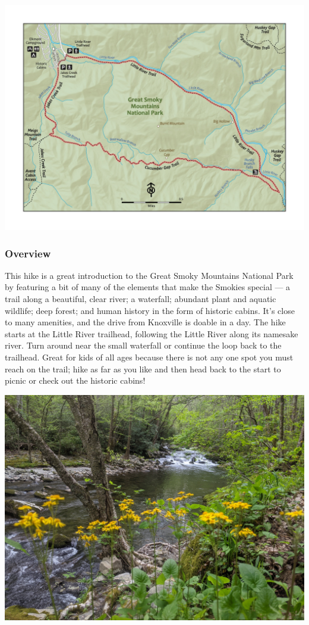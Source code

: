 \documentclass[
  letterpaper,
  DIV=11,
  numbers=noendperiod]{scrartcl}
\begin{document}
\includegraphics{maps/trail-21-map.jpeg}

\hypertarget{overview-20}{%
\subsubsection{Overview}\label{overview-20}}

This hike is a great introduction to the Great Smoky Mountains National
Park by featuring a bit of many of the elements that make the Smokies
special --- a trail along a beautiful, clear river; a waterfall;
abundant plant and aquatic wildlife; deep forest; and human history in
the form of historic cabins. It's close to many amenities, and the drive
from Knoxville is doable in a day. The hike starts at the Little River
trailhead, following the Little River along its namesake river. Turn
around near the small waterfall or continue the loop back to the
trailhead. Great for kids of all ages because there is not any one spot
you must reach on the trail; hike as far as you like and then head back
to the start to picnic or check out the historic cabins!

\includegraphics{img/trail-21-figure-01.jpg}
\end{document}
